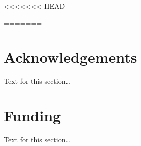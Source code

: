 \documentclass{bmcart}
\begin{document}
\begin{backmatter}

<<<<<<< HEAD


%
%
%
%
%
%
%
%
%
%
=======
\section*{Acknowledgements}%
Text for this section\ldots

\section*{Funding}%
Text for this section\ldots


\end{backmatter}
\end{document}
